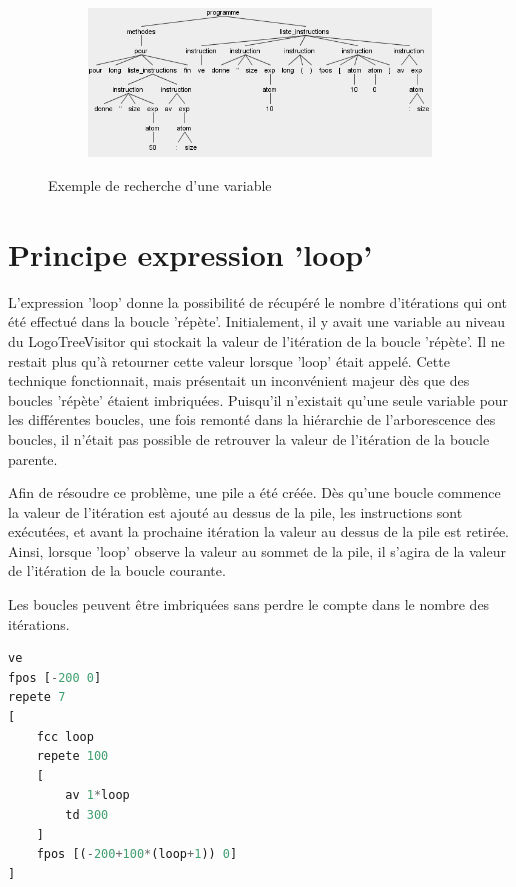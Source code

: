 \documentclass[a4paper,11pt]{article}
\begin{document}
\begin{figure}[!h]
\begin{subfigure}[t]{.15\textwidth}
	\end{subfigure}
	~
	\begin{subfigure}[t]{0.7\textwidth}
		\includegraphics[width=\textwidth]{img/var_tree}
	\end{subfigure}
	\caption{Exemple de recherche d'une variable}
\end{figure}

\section{Principe expression 'loop'}
L'expression 'loop' donne la possibilité de récupéré le nombre d'itérations qui ont été effectué dans la boucle 'répète'. Initialement, il y avait une variable au niveau du LogoTreeVisitor qui stockait la valeur de l'itération de la boucle 'répète'. Il ne restait plus qu'à retourner cette valeur lorsque 'loop' était appelé.
Cette technique fonctionnait, mais présentait un inconvénient majeur dès que des boucles 'répète' étaient imbriquées. Puisqu'il n'existait qu'une seule variable pour les différentes boucles, une fois remonté dans la hiérarchie de l'arborescence des boucles, il n'était pas possible de retrouver la valeur de l'itération de la boucle parente. 

Afin de résoudre ce problème, une pile a été créée. Dès qu'une boucle commence la valeur de l'itération est ajouté au dessus de la pile, les instructions sont exécutées, et avant la prochaine itération la valeur au dessus de la pile est retirée. Ainsi, lorsque 'loop' observe la valeur au sommet de la pile, il s'agira de la valeur de l'itération de la boucle courante.

Les boucles peuvent être imbriquées sans perdre le compte dans le nombre des itérations. 
\begin{lstlisting}[language=Python]
ve
fpos [-200 0]
repete 7
[
	fcc loop
	repete 100
	[
		av 1*loop
		td 300
	]
	fpos [(-200+100*(loop+1)) 0]	
]
\end{lstlisting}
\end{document}
